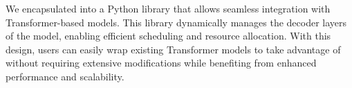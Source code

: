 We encapsulated \sys into a Python library that allows seamless integration with Transformer-based models. 
This library dynamically manages the decoder layers of the model, enabling efficient scheduling and resource allocation. 
With this design, users can easily wrap existing Transformer models to take advantage of \sys without requiring extensive modifications while benefiting from enhanced performance and scalability.

